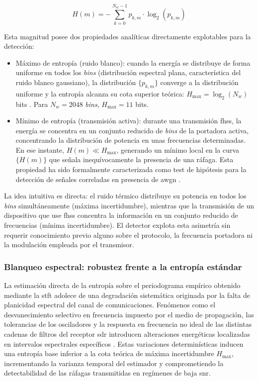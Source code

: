 \begin{equation}
    H(m) = -\sum_{k=0}^{N_w-1} p_{k,m} \cdot \log_2\!\left(p_{k,m}\right)
    \label{eq:entropia_shannon}
\end{equation}

Esta magnitud posee dos propiedades analíticas directamente explotables para la detección:

\begin{itemize}\itemsep 0em
    \item Máximo de entropía (ruido blanco): cuando la energía se distribuye de forma uniforme en todos los \textit{bins} (distribución espectral plana, característica del ruido blanco gaussiano), la distribución $\{p_{k,m}\}$ converge a la distribución uniforme y la entropía alcanza su cota superior teórica: $H_{\max} = \log_2(N_w)$ bits \cite{cover_elements_2006}. Para $N_w = 2048$ \textit{bins}, $H_{\max} = 11$ bits.

    \item Mínimo de entropía (transmisión activa): durante una transmisión \gls{fhss}, la energía se concentra en un conjunto reducido de \textit{bins} de la portadora activa, concentrando la distribución de potencia en unas frecuencias determinadas. En ese instante, $H(m) \ll H_{\max}$, generando un mínimo local en la curva $\{H(m)\}$ que señala inequívocamente la presencia de una ráfaga. Esta propiedad ha sido formalmente caracterizada como test de hipótesis para la detección de señales correladas en presencia de \gls{awgn} \cite{zhang_entropy-based_1989}.
\end{itemize}

La idea intuitiva es directa: el ruido térmico distribuye su potencia en todos los \textit{bins} simultáneamente (máxima incertidumbre), mientras que la transmisión de un dispositivo que use \gls{fhss} concentra la información en un conjunto reducido de frecuencias (mínima incertidumbre). El detector explota esta asimetría sin requerir conocimiento previo alguno sobre el protocolo, la frecuencia portadora ni la modulación empleada por el transmisor.

\subsubsection{Blanqueo espectral: robustez frente a la entropía estándar}
\label{subsubsec:whitening}

La estimación directa de la entropía sobre el periodograma empírico obtenido mediante la \gls{stft} adolece de una degradación sistemática originada por la falta de planicidad espectral del canal de comunicaciones. Fenómenos como el desvanecimiento selectivo en frecuencia impuesto por el medio de propagación, las tolerancias de los osciladores y la respuesta en frecuencia no ideal de las distintas cadenas de filtros del receptor \gls{sdr} introducen alteraciones energéticas localizadas en intervalos espectrales específicos \cite{tandra_snr_2008}. Estas variaciones determinísticas inducen una entropía base inferior a la cota teórica de máxima incertidumbre $H_{\max}$, incrementando la varianza temporal del estimador y comprometiendo la detectabilidad de las ráfagas transmitidas en regímenes de baja \gls{snr}.

